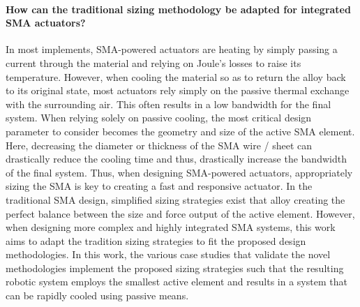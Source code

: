 \paragraph{How can the traditional sizing methodology be adapted for integrated SMA actuators?}
In most implements, SMA-powered actuators are heating by simply passing a current through the material and relying on Joule's losses to raise its temperature. However, when cooling the material so as to return the alloy back to its original state, most actuators rely simply on the passive thermal exchange with the surrounding air. This often results in a low bandwidth for the final system. When relying solely on passive cooling, the most critical design parameter to consider becomes the geometry and size of the active SMA element. Here, decreasing the diameter or thickness of the SMA wire / sheet can drastically reduce the cooling time and thus, drastically increase the bandwidth of the final system. Thus, when designing SMA-powered actuators, appropriately sizing the SMA is key to creating a fast and responsive actuator. In the traditional SMA design, simplified sizing strategies exist that alloy creating the perfect balance between the size and force output of the active element. However, when designing more complex and highly integrated SMA systems, this work aims to adapt the tradition sizing strategies to fit the proposed design methodologies. In this work, the various case studies that validate the novel methodologies implement the proposed sizing strategies such that the resulting robotic system employs the smallest active element and results in a system that can be rapidly cooled using passive means.

